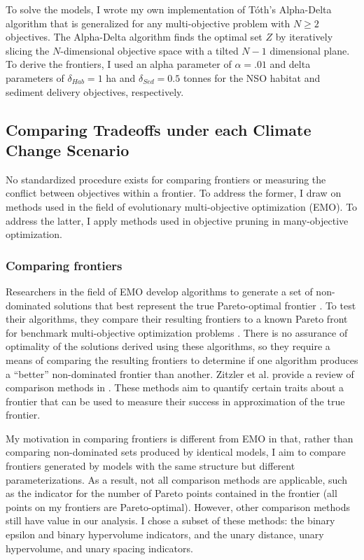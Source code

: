 To solve the models, I wrote my own implementation of T\'{o}th's Alpha-Delta algorithm \cite{TothThesis} that is generalized for any multi-objective problem with $N \ge 2$ objectives. The Alpha-Delta algorithm finds the optimal set $Z$ by iteratively slicing the $N$-dimensional objective space with a tilted $N-1$ dimensional plane. To derive the frontiers, I used an alpha parameter of $\alpha = .01$ and delta parameters of $\delta_{Hab} = 1$ ha and $\delta_{Sed} = 0.5$ tonnes for the NSO habitat and sediment delivery objectives, respectively.

\subsection{Comparing Tradeoffs under each Climate Change Scenario}

No standardized procedure exists for comparing frontiers or measuring the conflict between objectives within a frontier. To address the former, I draw on methods used in the field of evolutionary multi-objective optimization (EMO). To address the latter, I apply methods used in objective pruning in many-objective optimization.

\subsubsection{Comparing frontiers}
Researchers in the field of EMO develop algorithms to generate a set of non-dominated solutions that best represent the true Pareto-optimal frontier \cite{deb2001multi}. To test their algorithms, they compare their resulting frontiers to a known Pareto front for benchmark multi-objective optimization problems \cite{knowles2002metrics}. There is no assurance of optimality of the solutions derived using these algorithms, so they require a means of comparing the resulting frontiers to determine if one algorithm produces a ``better'' non-dominated frontier than another. Zitzler et al. provide a review of comparison methods in \cite{zitzler2003performance}. These methods aim to quantify certain traits about a frontier that can be used to measure their success in approximation of the true frontier.

My motivation in comparing frontiers is different from EMO in that, rather than comparing non-dominated sets produced by identical models, I aim to compare frontiers generated by models with the same structure but different parameterizations. As a result, not all comparison methods are applicable, such as the indicator for the number of Pareto points contained in the frontier (all points on my frontiers are Pareto-optimal). However, other comparison methods still have value in our analysis. I chose a subset of these methods: the binary epsilon and binary hypervolume indicators, and the unary distance, unary hypervolume, and unary spacing indicators.

